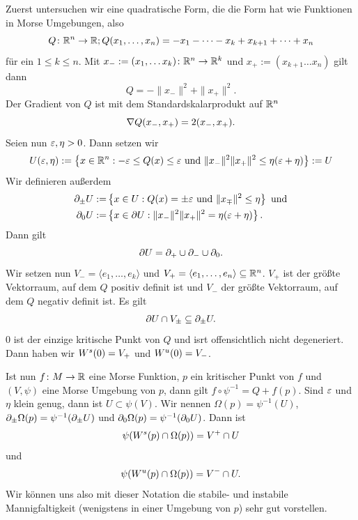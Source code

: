 \begin{definition}
    \label{def: notation morse umgebung}
    Zuerst untersuchen wir eine quadratische Form, die die Form hat wie Funktionen in Morse
    Umgebungen, also
    \[ Q \colon { \mathbb R }^n \to { \mathbb R } ; Q(x_1, \dots, x_n) = - x_1 - \dots - x_k + x_{k + 1} + \dots + x_n \]
    für ein $1 \leq k \leq n$.
    Mit $x_- := (x_1, \dots x_k) \colon { \mathbb R }^n \to { \mathbb R }^k$ und $x_+ := (x_{k + 1} \dots x_n)$ gilt dann
    \[ Q = - \| x_- \|^2 + \| x_+ \|^2 . \]
    Der Gradient von $Q$ ist mit dem Standardskalarprodukt auf ${ \mathbb R }^n$
    \[ { \nabla } Q (x_-, x_+) = 2(x_-, x_+) . \]
    Seien nun $\varepsilon, \eta > 0$. Dann setzen wir
    \[ U(\varepsilon, \eta) := \left\{ x \in { \mathbb R }^n : - \varepsilon \leq Q(x) \leq \varepsilon 
    \text{ und } \| x_- \|^2 \| x_+ \|^2 \leq \eta(\varepsilon + \eta) \right\} := U \]
    Wir definieren außerdem
    \begin{align*}
        { \partial }_{\pm} U := & \left\{ x \in U: Q(x) = \pm \varepsilon \text{ und } \|x_{\mp} \|^2 \leq \eta \right\} 
            \text{ und} \\
        { \partial }_0 U := & \left\{ x \in { \partial } U: \| x_- \|^2 \| x_+ \|^2 = \eta(\varepsilon + \eta) \right\} .
    \end{align*}
    Dann gilt 
    \[ { \partial } U = { \partial }_+ \cup { \partial }_- \cup { \partial }_0 . \]
    Wir setzen nun $V_- = \langle e_1, \dots, e_k \rangle$ und 
    $V_+ = \langle e_1, \dots, e_n \rangle \subseteq { \mathbb R }^n$. $V_+$ ist der größte Vektorraum, 
    auf dem $Q$ positiv definit ist und $V_-$ der größte Vektorraum, auf dem $Q$ negativ definit ist. 
    Es gilt 
    \[ { \partial } U \cap V_{\pm} \subseteq { \partial }_{\pm} U . \]
    $0$ ist der einzige kritische Punkt von $Q$ und isrt offensichtlich nicht degeneriert. Dann haben wir
    ${ W^s } (0) = V_+$ und ${ W^u } (0) = V_-$.

    Ist nun $f \colon M \to { \mathbb R }$ eine Morse Funktion, $p$ ein kritischer Punkt von $f$ und $(V, \psi)$
    eine Morse Umgebung von $p$, dann gilt $f \circ \psi^{-1} = Q + f(p)$. Sind $\varepsilon$ und $\eta$
    klein genug, dann ist $U \subset \psi(V)$. Wir nennen $\Omega (p) = \psi^{-1}(U)$,
    ${ \partial }_{\pm} \Omega (p) = \psi^{-1}({ \partial }_{\pm}U)$ und ${ \partial }_0 \Omega (p) = \psi^{-1} ({ \partial }_0 U)$.
    Dann ist 
    \[ \psi({ W^s } (p) \cap \Omega (p)) = V^+ \cap U \] 
    und 
    \[ \psi({ W^u } (p) \cap \Omega (p)) = V^- \cap U . \]
    Wir können uns also mit dieser Notation die stabile- und instabile Mannigfaltigkeit (wenigstens 
    in einer Umgebung von $p$) sehr gut vorstellen.


\end{definition}
